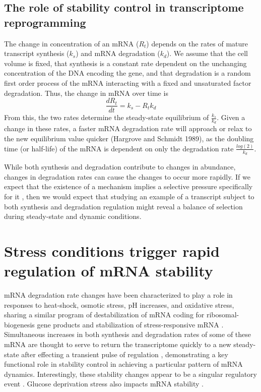 {\subsection{The role of stability control in transcriptome
reprogramming}

The change in concentration of an mRNA ($R_t$) depends
on the rates of mature transcript synthesis ($k_s$) and mRNA
degradation ($k_d$). We assume that the cell volume is fixed, that
synthesis is a constant rate dependent on the unchanging concentration
of the DNA encoding the gene, and that degradation is a random first
order process of the mRNA interacting with a fixed and unsaturated
factor degradation. Thus, the change in mRNA over time is $$
\frac{dR_t}{dt} = k_s - R_t k_d$$ From this, the two rates determine
the steady-state equilibrium of $\frac{k_s}{k_d}$. Given a change in
these rates, a faster mRNA degradation rate will approach or relax to
the new equilibrium value quicker (Hargrove and Schmidt 1989), as the
doubling time (or half-life) of the mRNA is dependent on only the
degradation rate $\frac{log(2)}{k_d}$.  

While both synthesis and
degradation contribute to changes in abundance, changes in degradation
rates can cause the changes to occur more rapidly. If we expect that
the existence of a mechanism implies a selective pressure specifically
for it 
\parencite{gould1979spandrels},
then we would expect that studying
an example of a transcript subject to both synthesis and degradation
regulation might reveal a balance of selection during steady-state and
dynamic conditions. 

\section{Stress conditions trigger rapid regulation of mRNA stability}

mRNA degradation rate changes have been characterized
to play a role in responses to heat-shock, osmotic stress, pH
increases, and oxidative stress, sharing a similar program of
destabilization of mRNA coding for ribosomal-biogenesis gene products
and stabilization of stress-responsive mRNA 
\parencite{canadell2015impact,molina2008comprehensive
  ,shalem2011transcriptome,romero2009specific,molin2009mrna
  ,castells2011heat,miller2011dynamic,garre2013nonsense}.
Simultaneous increases in both synthesis and
degradation rates of some of these mRNA are thought to serve to return
the transcriptome quickly to a new steady-state after effecting a
transient pulse of regulation 
\parencite{shalem2008transient,rabani2011metabolic},
demonstrating a key functional role in stability control in
achieving a particular pattern of mRNA dynamics. Interestingly, these
stability changes appear to be a singular regulatory event
\parencite{perez2013eukaryotic}. 
Glucose deprivation stress also impacts mRNA stability 
\parencite{munchel2011dynamic}.

}
